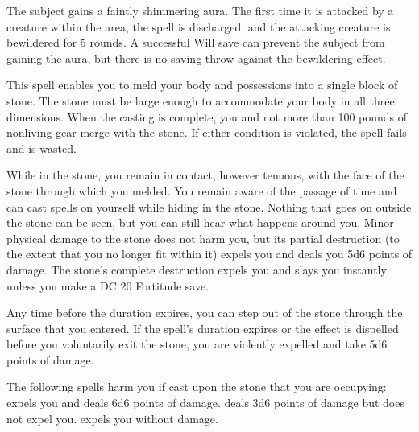 \spellrng{\rngclose}
\begin{spelleffect}
  The subject gains a faintly shimmering aura. The first time it is attacked by a creature within the area, the spell is discharged, and the attacking creature is bewildered for 5 rounds. A successful Will save can prevent the subject from gaining the aura, but there is no saving throw against the bewildering effect.
\end{spelleffect}

\spelldur{\durlong}
\begin{spelleffect}
  This spell enables you to meld your body and possessions into a single block of stone. The stone must be large enough to accommodate your body in all three dimensions. When the casting is complete, you and not more than 100 pounds of nonliving gear merge with the stone. If either condition is violated, the spell fails and is wasted.
  \par While in the stone, you remain in contact, however tenuous, with the face of the stone through which you melded. You remain aware of the passage of time and can cast spells on yourself while hiding in the stone. Nothing that goes on outside the stone can be seen, but you can still hear what happens around you. Minor physical damage to the stone does not harm you, but its partial destruction (to the extent that you no longer fit within it) expels you and deals you 5d6 points of damage. The stone's complete destruction expels you and slays you instantly unless you make a DC 20 Fortitude save.
  \par Any time before the duration expires, you can step out of the stone through the surface that you entered. If the spell's duration expires or the effect is dispelled before you voluntarily exit the stone, you are violently expelled and take 5d6 points of damage.
\end{spelleffect}
\begin{spellnotes}
  The following spells harm you if cast upon the stone that you are occupying:  expels you and deals 6d6 points of damage.  deals 3d6 points of damage but does not expel you.  expels you without damage.
\end{spellnotes}

